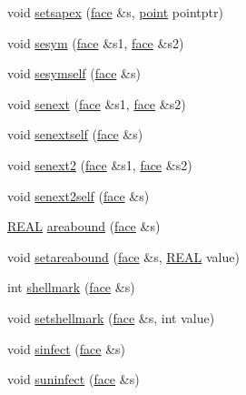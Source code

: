 \begin{DoxyCompactItemize}
\item 
void \hyperlink{classtetgenmesh_a6ffcca92e06edb606c952d7f76b89303}{setsapex} (\hyperlink{classtetgenmesh_1_1face}{face} \&s, \hyperlink{classtetgenmesh_ace3fb4f80389185b7c9b18ab69a3dea2}{point} pointptr)
\item 
void \hyperlink{classtetgenmesh_a1bedefbd18d6844450dd33911ff27ba8}{sesym} (\hyperlink{classtetgenmesh_1_1face}{face} \&s1, \hyperlink{classtetgenmesh_1_1face}{face} \&s2)
\item 
void \hyperlink{classtetgenmesh_a867b8f5e8312c7a918eb96813a6f6de7}{sesymself} (\hyperlink{classtetgenmesh_1_1face}{face} \&s)
\item 
void \hyperlink{classtetgenmesh_a5e0c9efed1fb3a19ed5c2b0721086840}{senext} (\hyperlink{classtetgenmesh_1_1face}{face} \&s1, \hyperlink{classtetgenmesh_1_1face}{face} \&s2)
\item 
void \hyperlink{classtetgenmesh_aec1136555f9371102995738aabe1e552}{senextself} (\hyperlink{classtetgenmesh_1_1face}{face} \&s)
\item 
void \hyperlink{classtetgenmesh_a9e2a0e8ac94c6273dd98c83b6c4bb0d9}{senext2} (\hyperlink{classtetgenmesh_1_1face}{face} \&s1, \hyperlink{classtetgenmesh_1_1face}{face} \&s2)
\item 
void \hyperlink{classtetgenmesh_a6d153db2af792b8c6e37fb4fee187f47}{senext2self} (\hyperlink{classtetgenmesh_1_1face}{face} \&s)
\item 
\hyperlink{tetgen_8h_a4b654506f18b8bfd61ad2a29a7e38c25}{R\+E\+AL} \hyperlink{classtetgenmesh_a589cf429e209ed7575602ede3d158d93}{areabound} (\hyperlink{classtetgenmesh_1_1face}{face} \&s)
\item 
void \hyperlink{classtetgenmesh_a0f80088cbe127eeac6995e365d10eb06}{setareabound} (\hyperlink{classtetgenmesh_1_1face}{face} \&s, \hyperlink{tetgen_8h_a4b654506f18b8bfd61ad2a29a7e38c25}{R\+E\+AL} value)
\item 
int \hyperlink{classtetgenmesh_ab5a2f1e0884a200fc6152ec15c2531d9}{shellmark} (\hyperlink{classtetgenmesh_1_1face}{face} \&s)
\item 
void \hyperlink{classtetgenmesh_aebfb8c5f527b8145bf96d2709993c59d}{setshellmark} (\hyperlink{classtetgenmesh_1_1face}{face} \&s, int value)
\item 
void \hyperlink{classtetgenmesh_aa417a432076c7de138fed761c5322f4f}{sinfect} (\hyperlink{classtetgenmesh_1_1face}{face} \&s)
\item 
void \hyperlink{classtetgenmesh_a511f009f29bef3d614063e9c174bc677}{suninfect} (\hyperlink{classtetgenmesh_1_1face}{face} \&s)

\end{DoxyCompactItemize}
